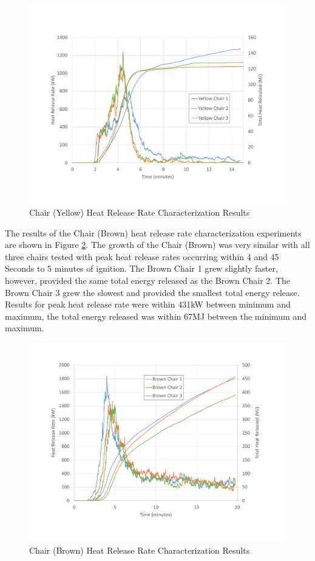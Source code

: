 \documentclass{article}
\begin{document}
\begin{figure}[H]
	\centering
	\includegraphics[width=\textwidth]{0_Images/Furniture/ChairYellow_HRR.pdf}
	\caption{Chair (Yellow) Heat Release Rate Characterization Results}
	\label{fig:YellowChairHRR}
\end{figure}

\clearpage

The results of the Chair (Brown) heat release rate characterization experiments are shown in Figure \ref{fig:BrownChairHRR}. The growth of the Chair (Brown) was very similar with all three chairs tested with peak heat release rates occurring within 4 and 45 Seconds to 5 minutes of ignition. The Brown Chair 1 grew slightly faster, however, provided the same total energy released as the Brown Chair 2. The Brown Chair 3 grew the slowest and provided the smallest total energy release. Results for peak heat release rate were within 431kW between minimum and maximum, the total energy released was within 67MJ between the minimum and maximum. 

\begin{figure}[H]
	\centering
	\includegraphics[width=\textwidth]{0_Images/Furniture/BrownChair_HRR.pdf}
	\caption{Chair (Brown) Heat Release Rate Characterization Results}
	\label{fig:BrownChairHRR}
\end{figure}
\end{document}
